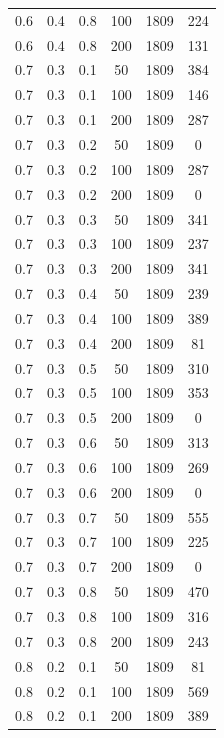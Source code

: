\documentclass[a4paper,14pt, unknownkeysallowed]{extreport}
\begin{document}
\begin{center}
\begin{longtable}[c]{|c|c|c|c|c|c|}
		0.6 &  0.4 &  0.8 &  100 &  1809 &   224 \\
		0.6 &  0.4 &  0.8 &  200 &  1809 &   131 \\
	   \hline
		0.7 &  0.3 &  0.1 &   50 &  1809 &   384 \\
		0.7 &  0.3 &  0.1 &  100 &  1809 &   146 \\
		0.7 &  0.3 &  0.1 &  200 &  1809 &   287 \\
	   \hline
		0.7 &  0.3 &  0.2 &   50 &  1809 &     0 \\
		0.7 &  0.3 &  0.2 &  100 &  1809 &   287 \\
		0.7 &  0.3 &  0.2 &  200 &  1809 &     0 \\
	   \hline
		0.7 &  0.3 &  0.3 &   50 &  1809 &   341 \\
		0.7 &  0.3 &  0.3 &  100 &  1809 &   237 \\
		0.7 &  0.3 &  0.3 &  200 &  1809 &   341 \\
	   \hline
		0.7 &  0.3 &  0.4 &   50 &  1809 &   239 \\
		0.7 &  0.3 &  0.4 &  100 &  1809 &   389 \\
		0.7 &  0.3 &  0.4 &  200 &  1809 &    81 \\
	   \hline
		0.7 &  0.3 &  0.5 &   50 &  1809 &   310 \\
		0.7 &  0.3 &  0.5 &  100 &  1809 &   353 \\
		0.7 &  0.3 &  0.5 &  200 &  1809 &     0 \\
	   \hline
		0.7 &  0.3 &  0.6 &   50 &  1809 &   313 \\
		0.7 &  0.3 &  0.6 &  100 &  1809 &   269 \\
		0.7 &  0.3 &  0.6 &  200 &  1809 &     0 \\
	   \hline
		0.7 &  0.3 &  0.7 &   50 &  1809 &   555 \\
		0.7 &  0.3 &  0.7 &  100 &  1809 &   225 \\
		0.7 &  0.3 &  0.7 &  200 &  1809 &     0 \\
	   \hline
		0.7 &  0.3 &  0.8 &   50 &  1809 &   470 \\
		0.7 &  0.3 &  0.8 &  100 &  1809 &   316 \\
		0.7 &  0.3 &  0.8 &  200 &  1809 &   243 \\
	   \hline
		0.8 &  0.2 &  0.1 &   50 &  1809 &    81 \\
		0.8 &  0.2 &  0.1 &  100 &  1809 &   569 \\
		0.8 &  0.2 &  0.1 &  200 &  1809 &   389 \\
	   \hline

\end{longtable}
\end{center}
\end{document}

